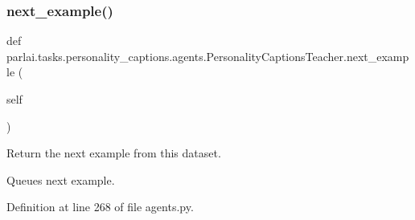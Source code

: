 \subsubsection{\texorpdfstring{next\+\_\+example()}{next\_example()}}
{\footnotesize\ttfamily def parlai.\+tasks.\+personality\+\_\+captions.\+agents.\+Personality\+Captions\+Teacher.\+next\+\_\+example (\begin{DoxyParamCaption}\item[{}]{self }\end{DoxyParamCaption})}

\begin{DoxyVerb}Return the next example from this dataset.

Queues next example.
\end{DoxyVerb}
 

Definition at line 268 of file agents.\+py.


